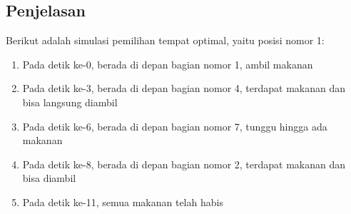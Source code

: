 \documentclass{article}
\begin{document}
\subsection*{Penjelasan}
Berikut adalah simulasi pemilihan tempat optimal, yaitu posisi nomor 1:

\begin{enumerate}
    \setlength{\itemsep}{0pt}
    \item Pada detik ke-0, berada di depan bagian nomor 1, ambil makanan
    \item Pada detik ke-3, berada di depan bagian nomor 4, terdapat makanan dan bisa langsung diambil
    \item Pada detik ke-6, berada di depan bagian nomor 7, tunggu hingga ada makanan
    \item Pada detik ke-8, berada di depan bagian nomor 2, terdapat makanan dan bisa diambil
    \item Pada detik ke-11, semua makanan telah habis
\end{enumerate}

\pagebreak
\end{document}

